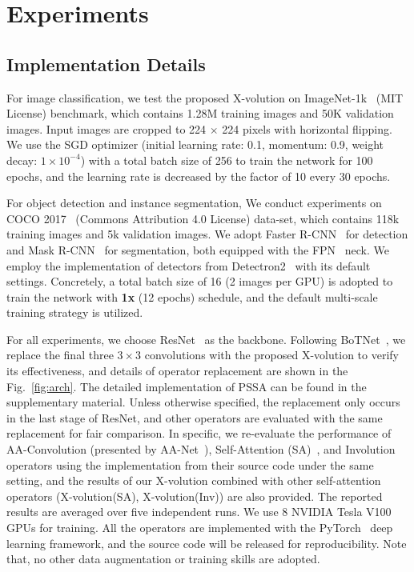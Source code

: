 \documentclass{article}
\begin{document}
\section{Experiments}
\subsection{Implementation Details}
\label{sec_4_1}
For image classification, we test the proposed X-volution on ImageNet-1k~\cite{DBLP:journals/ijcv/RussakovskyDSKS15} (MIT License) benchmark, which contains 1.28M training images and 50K validation images. Input images are cropped to 224 $\times$ 224 pixels with horizontal flipping. We use the SGD optimizer (initial learning rate: 0.1, momentum: 0.9, weight decay: $1 \times 10^{-4}$) with a total batch size of 256 to train the network for 100 epochs, and the learning rate is decreased by the factor of 10 every 30 epochs. 

For object detection and instance segmentation, We conduct experiments on COCO 2017~\cite{DBLP:conf/eccv/LinMBHPRDZ14} (Commons Attribution 4.0 License) data-set, which contains 118k training images and 5k validation images. 
We adopt Faster R-CNN~\cite{DBLP:conf/nips/RenHGS15} for detection and Mask R-CNN~\cite{DBLP:conf/iccv/HeGDG17} for segmentation, both equipped with the FPN~\cite{DBLP:conf/cvpr/LinDGHHB17} neck. 
We employ the implementation of detectors from Detectron2~\cite{wu2019detectron2} with its default settings.
Concretely, a total batch size of 16 (2 images per GPU) is adopted to train the network with \textbf{1x} (12 epochs) schedule, and the default multi-scale training strategy is utilized. 


For all experiments, we choose ResNet~\cite{DBLP:conf/cvpr/HeZRS16} as the backbone. Following BoTNet~\cite{DBLP:journals/corr/abs-2101-11605}, we replace the final three $3 \times 3$ convolutions with the proposed X-volution to verify its effectiveness, and details of operator replacement are shown in the Fig.~\ref{fig:arch}. The detailed implementation of PSSA can be found in the supplementary material. Unless otherwise specified, the replacement only occurs in the last stage of ResNet, and other operators are evaluated with the same replacement for fair comparison. 
In specific, we re-evaluate the performance of AA-Convolution (presented by AA-Net~\cite{DBLP:conf/iccv/BelloZLVS19}), Self-Attention (SA)~\cite{DBLP:conf/nips/VaswaniSPUJGKP17}, and Involution~\cite{DBLP:journals/corr/abs-2103-06255} operators using the implementation from their source code under the same setting, and the results of our X-volution combined with other self-attention operators (X-volution(SA), X-volution(Inv)) are also provided. The reported results are averaged over five independent runs.
We use 8 NVIDIA Tesla V100 GPUs for training. 
All the operators are implemented with the PyTorch~\cite{DBLP:conf/nips/PaszkeGMLBCKLGA19} deep learning framework, and the source code will be released for reproducibility. 
Note that, no other data augmentation or training skills are adopted.
\end{document}
